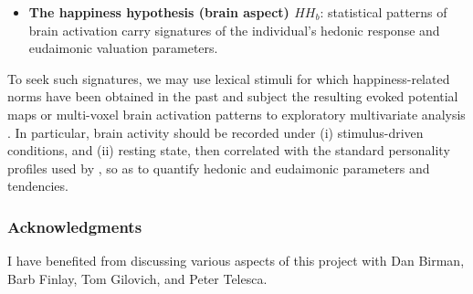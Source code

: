 \documentclass[11pt]{article}
\begin{document}
\begin{itemize}

  \item \textbf{The happiness hypothesis (brain aspect) $HH_b$}:
    statistical patterns of brain activation carry signatures of the
    individual's hedonic response and eudaimonic valuation
    parameters. 

\end{itemize}

\noindent
To seek such signatures, we may use lexical stimuli for which
happiness-related norms have been obtained in the past
\citep{DoddsDanforth10,DoddsEtAl11} and subject the resulting evoked
potential maps or multi-voxel brain activation patterns to exploratory
multivariate analysis \citep{ReshefEtAl11}. In particular, brain
activity should be recorded under (i) stimulus-driven conditions, and
(ii) resting state, then correlated with the standard personality
profiles used by \citet{FredricksonEtAl13}, so as to quantify hedonic
and eudaimonic parameters and tendencies.

\subsubsection*{Acknowledgments}

I have benefited from discussing various aspects of this project with
Dan Birman, Barb Finlay, Tom Gilovich, and Peter Telesca.




% 

\end{document}
